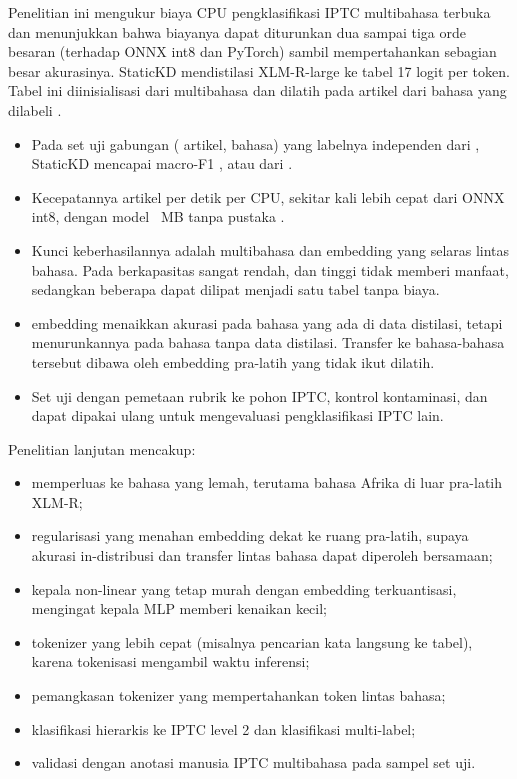 Penelitian ini mengukur biaya CPU pengklasifikasi IPTC multibahasa terbuka dan menunjukkan bahwa biayanya dapat diturunkan dua sampai tiga orde besaran (terhadap  ONNX int8 dan PyTorch) sambil mempertahankan sebagian besar akurasinya. StaticKD mendistilasi  XLM-R-large ke tabel 17 logit per token. Tabel ini diinisialisasi dari  multibahasa dan dilatih pada  artikel dari  bahasa yang dilabeli .
\begin{itemize}
  \item Pada set uji gabungan ( artikel,  bahasa) yang labelnya independen dari , StaticKD mencapai macro-F1 , atau  dari .
  \item Kecepatannya  artikel per detik per  CPU, sekitar  kali lebih cepat dari  ONNX int8, dengan model ~MB tanpa pustaka .
  \item Kunci keberhasilannya adalah  multibahasa dan embedding yang selaras lintas bahasa. Pada  berkapasitas sangat rendah,  dan  tinggi tidak memberi manfaat, sedangkan  beberapa  dapat dilipat menjadi satu tabel tanpa biaya.
  \item {} embedding menaikkan akurasi pada bahasa yang ada di data distilasi, tetapi menurunkannya pada bahasa tanpa data distilasi. Transfer ke bahasa-bahasa tersebut dibawa oleh embedding pra-latih yang tidak ikut dilatih.
  \item Set uji dengan pemetaan rubrik ke pohon IPTC, kontrol kontaminasi, dan  dapat dipakai ulang untuk mengevaluasi pengklasifikasi IPTC lain.
\end{itemize}

Penelitian lanjutan mencakup:
\begin{itemize}
  \item memperluas  ke bahasa yang lemah, terutama bahasa Afrika di luar pra-latih XLM-R;
  \item regularisasi  yang menahan embedding dekat ke ruang pra-latih, supaya akurasi in-distribusi dan transfer lintas bahasa dapat diperoleh bersamaan;
  \item kepala non-linear yang tetap murah dengan embedding terkuantisasi, mengingat kepala MLP memberi kenaikan kecil;
  \item tokenizer yang lebih cepat (misalnya pencarian kata langsung ke tabel), karena tokenisasi mengambil  waktu inferensi;
  \item pemangkasan tokenizer yang mempertahankan token lintas bahasa;
  \item klasifikasi hierarkis ke IPTC level 2 dan klasifikasi multi-label;
  \item validasi dengan anotasi manusia IPTC multibahasa pada sampel set uji.
\end{itemize}
